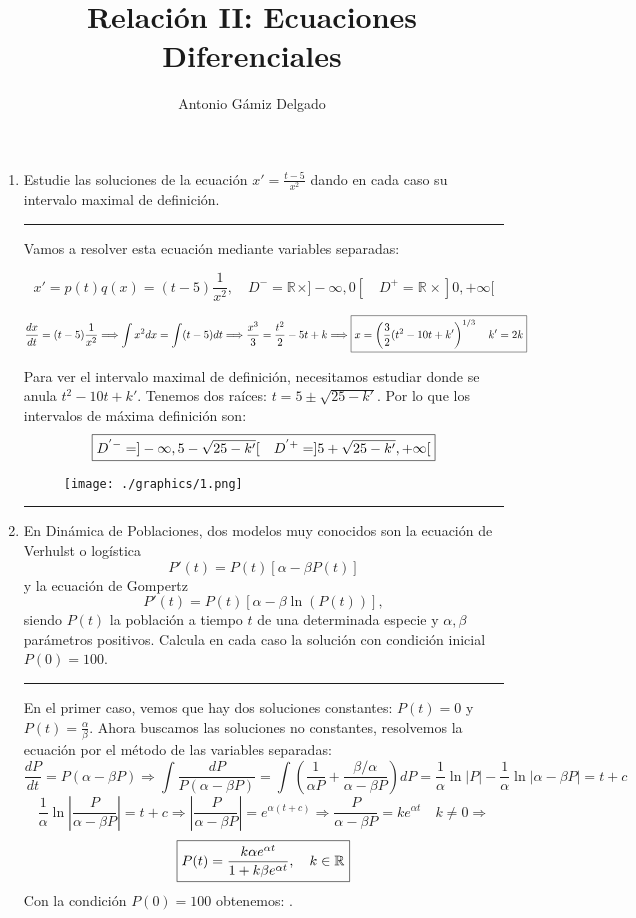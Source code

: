 \documentclass[12pt]{article}
\newcommand{\R}[1][]{\mathbb{R}^{#1}}
\newcommand{\solution}[1]{\text{\fbox{$#1$}}}
\newcommand{\abs}[1]{\left|#1\right|}
\begin{document}

\author{Antonio Gámiz Delgado}
\title{Relación II: Ecuaciones Diferenciales}
\maketitle


\begin{enumerate}
\hrule
\item Estudie las soluciones de la ecuación $\displaystyle x'=\frac{t-5}{x^2}$ dando en cada caso su intervalo maximal de definición. \\
\hrule

Vamos a resolver esta ecuación mediante variables separadas: 

\[
x'=p(t)q(x)=(t-5)\frac{1}{x^2}, \quad D^-=\R \times ]-\infty,0[ \quad D^+=\R \times ]0,+\infty[
\]

\[
\frac{dx}{dt}=(t-5)\frac{1}{x^2} \Longrightarrow \int x^2dx=\int (t-5)dt \Longrightarrow \frac{x^3}{3}=\frac{t^2}{2}-5t+k \Longrightarrow \solution{x = \left(\frac{3}{2}(t^2-10t+k'\right)^{1/3}\quad k'=2k}
\]



Para ver el intervalo maximal de definición, necesitamos estudiar donde se anula $t^2-10t+k'$. Tenemos dos raíces: $t = 5\pm \sqrt{25-k'}$. Por lo que los intervalos de máxima definición son:
\[
\solution{D^{'-}=]-\infty,5-\sqrt{25-k'}[ \quad D^{'+}=]5+\sqrt{25-k'},+\infty[}
\]

\begin{figure}[h!]
\center
\texttt{[image: ./graphics/1.png]}
\end{figure}
\newpage
\hrule
\item En Dinámica de Poblaciones, dos modelos muy conocidos son la ecuación de Verhulst o logística
\[
P'(t)=P(t)[\alpha-\beta P(t)]
\]
y la ecuación de Gompertz
\[
P'(t)=P(t)[\alpha-\beta \ln(P(t))],
\]
siendo $P(t)$ la población a tiempo $t$ de una determinada especie y $\alpha, \beta$ parámetros positivos. Calcula en cada caso la solución con condición inicial $P(0)=100$. \\


\hrule

En el primer caso, vemos que hay dos soluciones constantes: $P(t)=0$ y $P(t)=\frac{\alpha}{\beta}$. Ahora buscamos las soluciones no constantes, resolvemos la ecuación por el método de las variables separadas:
\[
\frac{dP}{dt}=P(\alpha-\beta P) \Longrightarrow \int\frac{dP}{P(\alpha-\beta P)}=\int \left(\frac{1}{\alpha P} + \frac{\beta/\alpha}{\alpha - \beta P}\right)dP=\frac{1}{\alpha}\ln|P|-\frac{1}{\alpha}\ln|\alpha-\beta P|=t+c
\]
\[
\frac{1}{\alpha}\ln\abs{\frac{P}{\alpha-\beta P}}=t+c\Longrightarrow \abs{\frac{P}{\alpha-\beta P}} = e^{\alpha(t+c)} \Longrightarrow \frac{P}{\alpha-\beta P} = ke^{\alpha t} \quad k\neq 0 \Longrightarrow 
\]
\[
\solution{P(t)=\frac{k\alpha e^{\alpha t}}{1+k\beta e^{\alpha t}}, \quad k\in\R}
\]
Con la condición $P(0)=100$ obtenemos: \solution{k=\frac{100}{\alpha - 100\beta}}.


\end{enumerate}
\end{document}

